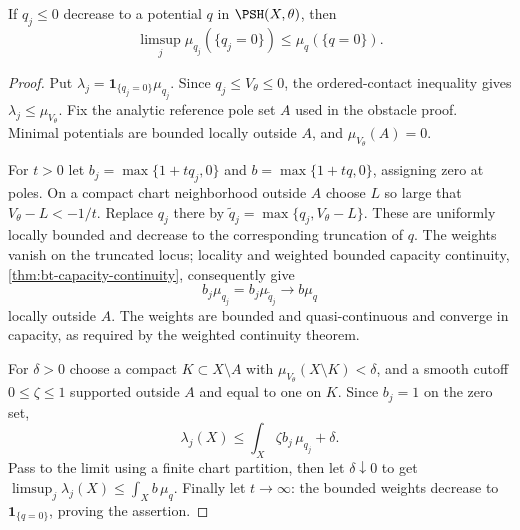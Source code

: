 \begin{lemma}\label{lem:decreasing-zero-contact-mass}
If $q_j\leq0$ decrease to a potential $q$ in $\PSH(X,\theta)$, then
\[
 \limsup_j\mu_{q_j}(\{q_j=0\})\leq\mu_q(\{q=0\}).
\]
\end{lemma}
\begin{proof}
Put $\lambda_j=\mathbf1_{\{q_j=0\}}\mu_{q_j}$. Since $q_j\leq V_\theta\leq0$, the ordered-contact inequality gives $\lambda_j\leq\mu_{V_\theta}$. Fix the analytic reference pole set $A$ used in the obstacle proof. Minimal potentials are bounded locally outside $A$, and $\mu_{V_\theta}(A)=0$.

For $t>0$ let $b_j=\max\{1+tq_j,0\}$ and $b=\max\{1+tq,0\}$, assigning zero at poles. On a compact chart neighborhood outside $A$ choose $L$ so large that $V_\theta-L<-1/t$. Replace $q_j$ there by $\widetilde q_j=\max\{q_j,V_\theta-L\}$. These are uniformly locally bounded and decrease to the corresponding truncation of $q$. The weights vanish on the truncated locus; locality and weighted bounded capacity continuity, \cref{thm:bt-capacity-continuity}, consequently give
\[
 b_j\mu_{q_j}=b_j\mu_{\widetilde q_j}
                 \longrightarrow b\mu_q
\]
locally outside $A$. The weights are bounded and quasi-continuous and converge in capacity, as required by the weighted continuity theorem.

For $\delta>0$ choose a compact $K\subset X\setminus A$ with $\mu_{V_\theta}(X\setminus K)<\delta$, and a smooth cutoff $0\leq\zeta\leq1$ supported outside $A$ and equal to one on $K$. Since $b_j=1$ on the zero set,
\[
 \lambda_j(X)\leq\int_X\zeta b_j\,\mu_{q_j}+\delta.
\]
Pass to the limit using a finite chart partition, then let $\delta\downarrow0$ to get
$\limsup_j\lambda_j(X)\leq\int_Xb\,\mu_q$. Finally let $t\to\infty$: the bounded weights decrease to $\mathbf1_{\{q=0\}}$, proving the assertion.
\end{proof}

